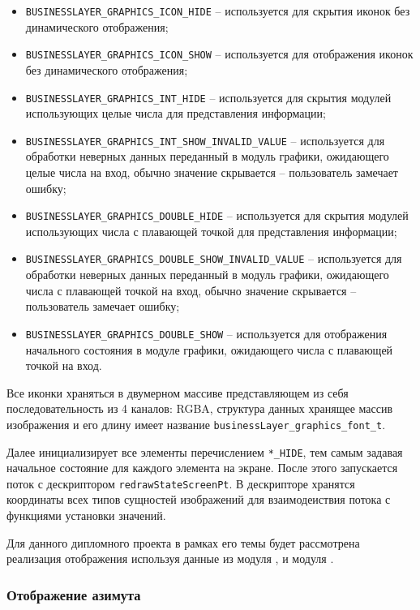 \begin{itemize}
    \item \lstinline{BUSINESSLAYER_GRAPHICS_ICON_HIDE} -- используется для скрытия иконок без динамического отображения;
    \item \lstinline{BUSINESSLAYER_GRAPHICS_ICON_SHOW} -- используется для отображения иконок без динамического отображения;
    \item \lstinline{BUSINESSLAYER_GRAPHICS_INT_HIDE} -- используется для скрытия модулей использующих целые числа для представления информации;
    \item \lstinline{BUSINESSLAYER_GRAPHICS_INT_SHOW_INVALID_VALUE} -- используется для обработки неверных данных переданный в модуль графики, ожидающего целые числа на вход, обычно значение скрывается -- пользователь замечает ошибку;
    \item \lstinline{BUSINESSLAYER_GRAPHICS_DOUBLE_HIDE} -- используется для скрытия модулей использующих числа с плавающей точкой для представления информации;
    \item \lstinline{BUSINESSLAYER_GRAPHICS_DOUBLE_SHOW_INVALID_VALUE} -- используется для обработки неверных данных переданный в модуль графики, ожидающего числа с плавающей точкой на вход, обычно значение скрывается -- пользователь замечает ошибку;
    \item \lstinline{BUSINESSLAYER_GRAPHICS_DOUBLE_SHOW} -- используется для отображения начального состояния в модуле графики, ожидающего числа с плавающей точкой на вход.
\end{itemize}

Все иконки храняться в двумерном массиве представляющем из себя последовательность из 4 каналов: RGBA, структура данных хранящее массив изображения и его длину имеет название \lstinline{businessLayer_graphics_font_t}.

Далее инициализирует все элементы перечислением \lstinline{*_HIDE}, тем самым задавая начальное состояние для каждого элемента на экране.
После этого запускается поток с дескриптором \lstinline{redrawStateScreenPt}. В дескрипторе хранятся координаты всех типов сущностей изображений для взаимодеиствия потока
с функциями установки значений.

Для данного дипломного проекта в рамках его темы будет рассмотрена реализация отображения используя данные из модуля \moduleOrientationAzimuth, и модуля \moduleFindTarget .

\subsubsection{Отображение азимута}

